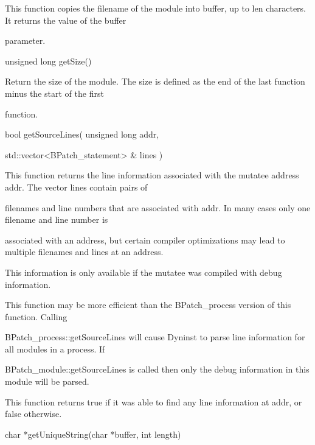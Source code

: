{{{{

This function copies the filename of the module into buffer, up to len characters. It returns the value of the buffer

parameter.}



{

unsigned long getSize()}



{

Return the size of the module. The size is defined as the end of the last function minus the start of the first

function.}



{

bool getSourceLines( unsigned long addr,

std::vector<BPatch_statement> & lines )}



{

This function returns the line information associated with the mutatee address addr. The vector lines contain pairs of

filenames and line numbers that are associated with addr. In many cases only one filename and line number is

associated with an address, but certain compiler optimizations may lead to multiple filenames and lines at an address.

This information is only available if the mutatee was compiled with debug information.}



{

This function may be more efficient than the BPatch_process version of this function. Calling

BPatch_process::getSourceLines will cause Dyninst to parse line information for all modules in a process. If

BPatch_module::getSourceLines is called then only the debug information in this module will be parsed.}



{

This function returns true if it was able to find any line information at addr, or false otherwise.}



{

char *getUniqueString(char *buffer, int length)}



}}}
